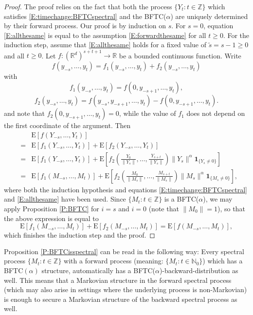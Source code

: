 \documentclass{aptpubarxiv}
\numberwithin{equation}{section}
\begin{document}
\begin{proof}
The proof relies on the fact that both the process $\{Y_t: t \in \mathbb{Z}\}$ which satisfies \eqref{E:timechange:BFTCspectral} and the BFTC($\alpha$) are uniquely determined by their forward process. Our proof is by induction on $s$. For $s=0$, equation \eqref{E:allthesame} is equal to the assumption \eqref{E:forwardthesame} for all $t \geq 0$. For the induction step, assume that \eqref{E:allthesame} holds for a fixed value of $\tilde{s}=s-1\geq 0$ and all $t \geq 0$. Let $f:(\mathbb{R}^d)^{s+t+1} \to \mathbb{R}$ be a bounded continuous function. Write 
$$f(y_{-s}, \dots, y_t)=f_1(y_{-s}, \dots, y_t)+f_2(y_{-s}, \dots,y_t)$$
with
$$f_1(y_{-s}, \dots, y_t)=f(0,y_{-s+1}, \dots, y_t),$$
$$f_2(y_{-s}, \dots, y_t)=f(y_{-s}, y_{-s+1}, \dots, y_t)-f(0, y_{-s+1}, \dots, y_t).$$
and note that $f_2(0, y_{-s+1}, \dots, y_t)=0$, while the value of $f_1$ does not depend on the first coordinate of the argument.
Then
\begin{eqnarray*}
&& {\mathrm{E}}[f(Y_{-s}, \dots, Y_t)]\\
&=& {\mathrm{E}}[f_1(Y_{-s}, \dots, Y_t)]+{\mathrm{E}}[f_2(Y_{-s}, \dots, Y_t)] \\
&=& {\mathrm{E}}[f_1(Y_{-s}, \dots, Y_{t})]+ {\mathrm{E}}\left[f_2\left(\frac{Y_0}{\|Y_s\|}, \ldots, \frac{Y_{s+t}}{\|Y_s\|}\right) \|Y_s\|^\alpha{\boldsymbol{1}}_{\{Y_s \neq 0\}} \right] \\
&=& {\mathrm{E}}[f_1(M_{-s}, \dots, M_{t})]+ {\mathrm{E}}\left[f_2\left(\frac{M_0}{\|M_s\|}, \ldots, \frac{M_{s+t}}{\|M_s\|}\right) \|M_s\|^\alpha{\boldsymbol{1}}_{\{M_s \neq 0\}} \right] ,
\end{eqnarray*}
where both the induction hypothesis and equations \eqref{E:timechange:BFTCspectral} and \eqref{E:allthesame} have been used. Since $\{M_t: t \in \mathbb{Z}\}$ is a BFTC($\alpha$), we may apply Proposition \ref{P:BFTC} for $i=s$ and $i=0$ (note that $\|M_0\|=1$), so that the above expression is equal to
\begin{equation*} {\mathrm{E}}[f_1(M_{-s}, \dots, M_{t})]+ {\mathrm{E}}\left[f_2\left(M_{-s}, \ldots, M_{t}\right)\right] ={\mathrm{E}}[f(M_{-s}, \dots, M_{t})], 
\end{equation*}
which finishes the induction step and the proof.
\end{proof}
\begin{rem}
Proposition \ref{P:BFTCisspectral} can be read in the following way: Every spectral process $\{M_t:t \in \mathbb{Z}\}$ with a forward process (meaning: $\{M_t:t \in \mathbb{N}_0\}$) which has a BFTC$(\alpha)$ structure, automatically has a BFTC($\alpha$)-backward-distribution as well. This means that a Markovian structure in the forward spectral process (which may also arise in settings where the underlying process is non-Markovian) is enough to secure a Markovian structure of the backward spectral process as well.    
\end{rem}
\end{document}
